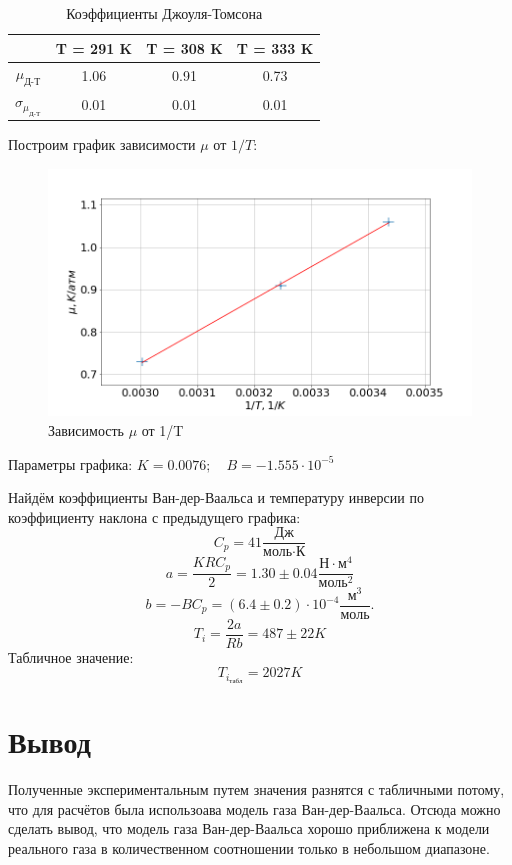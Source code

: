 \documentclass[a4paper, fontsize=14pt]{article}
\begin{document}
\begin{table}[H]

	\centering
	\begin{tabular}{|c|c|c|c|} \hline
		 & T = 291 K & T = 308 K & T = 333 K \\ \hline
		$\mu_{\text{Д-Т}}$ & 1.06 & 0.91 & 0.73  \\ \hline
		$\sigma_{\mu_{\text{Д-Т}}} $ & 0.01 & 0.01 & 0.01 \\ \hline
	\end{tabular}
		\caption{Коэффициенты Джоуля-Томсона}
\end{table}
Построим график зависимости $\mu$ от $1/T$:
\begin{figure}[H]
	\includegraphics[width = \linewidth]{result.png}
	\caption{Зависимость $\mu$ от 1/T}
\end{figure}

Параметры графика: $K = 0.0076; \quad B = -1.555 \cdot 10^{-5}$

 
Найдём коэффициенты Ван-дер-Ваальса и температуру инверсии по коэффициенту наклона с предыдущего графика:
\[
	C_p = 41 \frac{\text{Дж}}{\text{моль} \cdot \text{К}}
\]
\[
a = \frac{KRC_p}{2} = 1.30 \pm 0.04 \frac{\text{Н}\cdot\text{м}^4}{\text{моль}^2} 
\]
\[
b = -BC_p  = (6.4 \pm 0.2)\cdot 10^{-4} \frac{\text{м}^3}{\text{моль}}.
\]
\[
	T_i = \frac{2a}{Rb} = 487 \pm 22 K
\]
Табличное значение:
\[
	T_{i_\text{табл}} = 2027 K
\]
\section*{Вывод}

Полученные экспериментальным путем значения разнятся с табличными потому, что для расчётов была использоава модель газа Ван-дер-Ваальса. Отсюда можно сделать вывод, что модель газа Ван-дер-Ваальса хорошо приближена к модели реального газа в количественном соотношении только в небольшом диапазоне.
\end{document}
